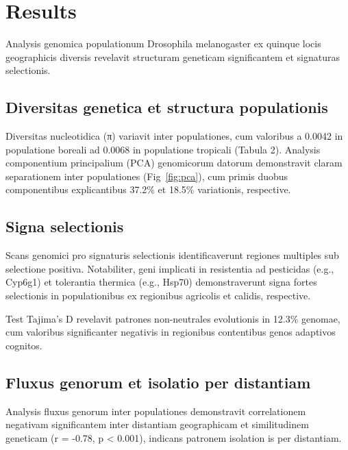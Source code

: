 \documentclass[
]{article}
\begin{document}
\section{Results}\label{results}

Analysis genomica populationum Drosophila melanogaster ex quinque locis
geographicis diversis revelavit structuram geneticam significantem et
signaturas selectionis.

\subsection{Diversitas genetica et structura
populationis}\label{diversitas-genetica-et-structura-populationis}

Diversitas nucleotidica (π) variavit inter populationes, cum valoribus a
0.0042 in populatione boreali ad 0.0068 in populatione tropicali (Tabula
2). Analysis componentium principalium (PCA) genomicorum datorum
demonstravit claram separationem inter populationes (Fig~\ref{fig:pca}),
cum primis duobus componentibus explicantibus 37.2\% et 18.5\%
variationis, respective.

\subsection{Signa selectionis}\label{signa-selectionis}

Scans genomici pro signaturis selectionis identificaverunt regiones
multiples sub selectione positiva. Notabiliter, geni implicati in
resistentia ad pesticidas (e.g., Cyp6g1) et tolerantia thermica (e.g.,
Hsp70) demonstraverunt signa fortes selectionis in populationibus ex
regionibus agricolis et calidis, respective.

Test Tajima's D revelavit patrones non-neutrales evolutionis in 12.3\%
genomae, cum valoribus significanter negativis in regionibus contentibus
genos adaptivos cognitos.

\subsection{Fluxus genorum et isolatio per
distantiam}\label{fluxus-genorum-et-isolatio-per-distantiam}

Analysis fluxus genorum inter populationes demonstravit correlationem
negativam significantem inter distantiam geographicam et similitudinem
geneticam (r = -0.78, p \textless{} 0.001), indicans patronem isolation
is per distantiam.
\end{document}
